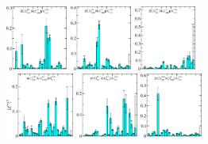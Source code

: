 \begin{figure}[H]
    \includegraphics[width=0.18\textwidth]{figures/sigmas/g2u/zfactors/zfactor_isotriplet_kbar_nucleon-G2u_1-P011-B2-SS_3-P0-1-1-G-SS_0.pdf}
    \includegraphics[width=0.18\textwidth]{figures/sigmas/g2u/zfactors/zfactor_isotriplet_kbar_nucleon-G2u_1-P111-A2-SS_0-P-1-1-1-G-SS_0.pdf}
    \includegraphics[width=0.18\textwidth]{figures/sigmas/g2u/zfactors/zfactor_isotriplet_kbar_nucleon-G2u_1-P111-A2-SS_1-P-1-1-1-G-SS_0.pdf}\\
    \includegraphics[width=0.1975\textwidth]{figures/sigmas/g2u/zfactors/zfactor_isotriplet_pion_lambda-G2u_1-P001-A2m-SS_1-P00-1-G2-LSD_1.pdf}
    \includegraphics[width=0.18\textwidth]{figures/sigmas/g2u/zfactors/zfactor_isotriplet_pion_lambda-G2u_1-P001-Ep-SS_1-P00-1-G1-SS_1.pdf}
    \includegraphics[width=0.18\textwidth]{figures/sigmas/g2u/zfactors/zfactor_isotriplet_pion_lambda-G2u_1-P011-A2m-SS_0-P0-1-1-G-SS_0.pdf}

\end{figure}
